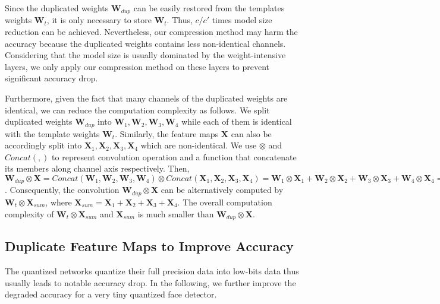 \documentclass[10pt,twocolumn,letterpaper]{article}
\begin{document}
Since the duplicated weights $\textbf{W}_{dup}$ can be easily restored from the templates weights $\textbf{W}_t$, it is only necessary to store $\textbf{W}_t$. Thus,  $c/c{'}$ times model size reduction can be achieved. Nevertheless, our compression method may harm the accuracy because the duplicated weights contains less non-identical channels. Considering that the model size is usually dominated by the weight-intensive layers, we only apply our compression method on these layers to prevent significant accuracy drop.

Furthermore, given the fact that many channels of the duplicated weights are identical, we can reduce the computation complexity as follows. We split duplicated weights $\textbf{W}_{dup}$ into $\textbf{W}_1, \textbf{W}_2, \textbf{W}_3, \textbf{W}_4$ while each of them is identical with the template weights $\textbf{W}_t$. Similarly, the feature maps $\textbf{X}$ can also be accordingly split into $\textbf{X}_1, \textbf{X}_2, \textbf{X}_3, \textbf{X}_4$ which are non-identical. We use  $\otimes$  and $Concat(,)$ to represent convolution operation and a function that concatenate its members along channel axis respectively. Then, $\textbf{W}_{dup} \otimes \textbf{X} = Concat(\textbf{W}_1, \textbf{W}_2, \textbf{W}_3, \textbf{W}_4) \otimes Concat(\textbf{X}_1, \textbf{X}_2, \textbf{X}_3, \textbf{X}_4) = \textbf{W}_1 \otimes \textbf{X}_1 + \textbf{W}_2 \otimes \textbf{X}_2 + \textbf{W}_3 \otimes \textbf{X}_3 + \textbf{W}_4 \otimes \textbf{X}_4 = \textbf{W}_{t} \otimes (\textbf{X}_1 + \textbf{X}_2 + \textbf{X}_3 + \textbf{X}_4)$. Consequently, the convolution $\textbf{W}_{dup} \otimes \textbf{X}$ can be alternatively computed by $\textbf{W}_{t} \otimes \textbf{X}_{sum}$,  where $\textbf{X}_{sum} =\textbf{X}_1 + \textbf{X}_2 + \textbf{X}_3 + \textbf{X}_4$.  The overall computation complexity of $\textbf{W}_{t} \otimes \textbf{X}_{sum}$ and $\textbf{X}_{sum}$ is much smaller than $\textbf{W}_{dup} \otimes \textbf{X}$.



\subsection{Duplicate Feature Maps to Improve Accuracy}\label{subSec:Xdup}

The quantized networks quantize their full precision data into low-bits data thus usually leads to notable accuracy drop. In the following, we further improve the degraded accuracy for a very tiny quantized face detector.
\end{document}
